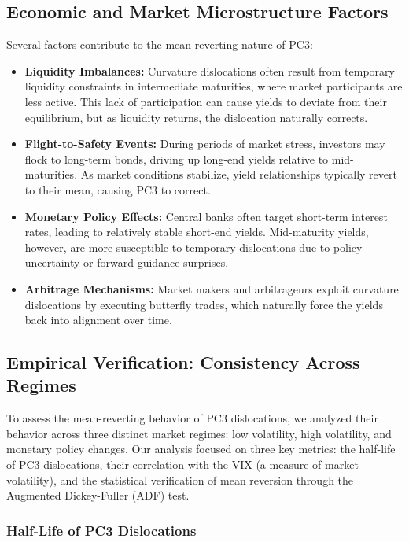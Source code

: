 \documentclass[12pt]{article}
\begin{document}
\subsection{Economic and Market Microstructure Factors}

Several factors contribute to the mean-reverting nature of PC3:

\begin{itemize}
    \item \textbf{Liquidity Imbalances:} Curvature dislocations often result from temporary liquidity constraints in intermediate maturities, where market participants are less active. This lack of participation can cause yields to deviate from their equilibrium, but as liquidity returns, the dislocation naturally corrects.
    \item \textbf{Flight-to-Safety Events:} During periods of market stress, investors may flock to long-term bonds, driving up long-end yields relative to mid-maturities. As market conditions stabilize, yield relationships typically revert to their mean, causing PC3 to correct.
    \item \textbf{Monetary Policy Effects:} Central banks often target short-term interest rates, leading to relatively stable short-end yields. Mid-maturity yields, however, are more susceptible to temporary dislocations due to policy uncertainty or forward guidance surprises.
    \item \textbf{Arbitrage Mechanisms:} Market makers and arbitrageurs exploit curvature dislocations by executing butterfly trades, which naturally force the yields back into alignment over time.
\end{itemize}

\subsection{Empirical Verification: Consistency Across Regimes}

To assess the mean-reverting behavior of PC3 dislocations, we analyzed their behavior across three distinct market regimes: low volatility, high volatility, and monetary policy changes. Our analysis focused on three key metrics: the half-life of PC3 dislocations, their correlation with the VIX (a measure of market volatility), and the statistical verification of mean reversion through the Augmented Dickey-Fuller (ADF) test.

\subsubsection{Half-Life of PC3 Dislocations}
\end{document}
